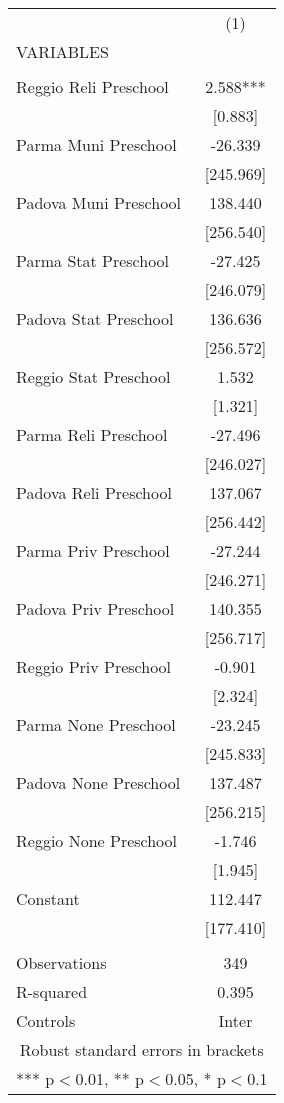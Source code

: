 \begin{tabular}{lc} \hline
 & (1) \\
VARIABLES &  \\ \hline
 &  \\
Reggio Reli Preschool & 2.588*** \\
 & [0.883] \\
Parma Muni Preschool & -26.339 \\
 & [245.969] \\
Padova Muni Preschool & 138.440 \\
 & [256.540] \\
Parma Stat Preschool & -27.425 \\
 & [246.079] \\
Padova Stat Preschool & 136.636 \\
 & [256.572] \\
Reggio Stat Preschool & 1.532 \\
 & [1.321] \\
Parma Reli Preschool & -27.496 \\
 & [246.027] \\
Padova Reli Preschool & 137.067 \\
 & [256.442] \\
Parma Priv Preschool & -27.244 \\
 & [246.271] \\
Padova Priv Preschool & 140.355 \\
 & [256.717] \\
Reggio Priv Preschool & -0.901 \\
 & [2.324] \\
Parma None Preschool & -23.245 \\
 & [245.833] \\
Padova None Preschool & 137.487 \\
 & [256.215] \\
Reggio None Preschool & -1.746 \\
 & [1.945] \\
Constant & 112.447 \\
 & [177.410] \\
 &  \\
Observations & 349 \\
R-squared & 0.395 \\
 Controls & Inter \\ \hline
\multicolumn{2}{c}{ Robust standard errors in brackets} \\
\multicolumn{2}{c}{ *** p$<$0.01, ** p$<$0.05, * p$<$0.1} \\
\end{tabular}
